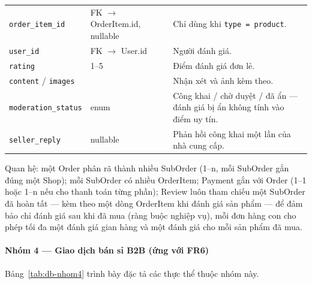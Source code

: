 \begin{longtable}{L{4.97cm} L{3.85cm} L{6.08cm}}
\texttt{order\_item\_id} & FK $\to$ OrderItem.id, nullable & Chỉ dùng khi \texttt{type = product}. \\
\texttt{user\_id} & FK $\to$ User.id & Người đánh giá. \\
\texttt{rating} & 1--5 & Điểm đánh giá đơn lẻ. \\
\texttt{content} / \texttt{images} & & Nhận xét và ảnh kèm theo. \\
\texttt{moderation\_status} & enum & Công khai / chờ duyệt / đã ẩn --- đánh giá bị ẩn không tính vào điểm uy tín. \\
\texttt{seller\_reply} & nullable & Phản hồi công khai một lần của nhà cung cấp. \\
\end{longtable}
\endgroup
Quan hệ: một Order phân rã thành nhiều SubOrder (1--n, mỗi
SubOrder gắn đúng một Shop); mỗi SubOrder có nhiều
OrderItem; Payment gắn với Order (1--1 hoặc 1--n nếu cho
thanh toán từng phần); Review luôn tham chiếu một SubOrder đã hoàn tất ---
kèm theo một dòng OrderItem khi đánh giá sản phẩm --- để đảm bảo chỉ
đánh giá sau khi đã mua (ràng buộc nghiệp vụ), mỗi đơn hàng con cho phép tối
đa một đánh giá gian hàng và một đánh giá cho mỗi sản phẩm đã mua.
 
\paragraph*{Nhóm 4 --- Giao dịch bán sỉ B2B (ứng với FR6)}

\noindent Bảng~\ref{tab:db-nhom4} trình bày đặc tả các thực thể thuộc nhóm này.
 
